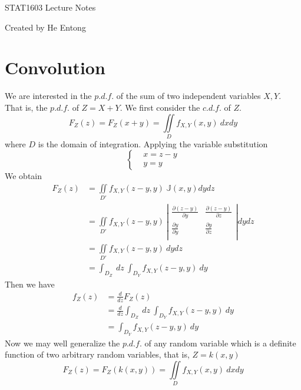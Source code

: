 \documentclass[16pt]{article}
\begin{document}
STAT1603 Lecture Notes \par
\small{Created by He Entong}
\section{Convolution}
We are interested in the $p.d.f.$ of the sum of two independent variables $X, Y$. That is, the $p.d.f.$ of $Z = X + Y$. We first consider the $c.d.f.$ of $Z$.
\begin{equation}
    F_Z(z) = F_Z(x+y) = \iint \limits_{D} f_{X,Y}(x, y) ~dxdy
\end{equation}
where $D $ is the domain of integration.
Applying the variable substitution
\begin{equation}
\left\{
\begin{aligned}
    & x = z - y\\
    & y = y
\end{aligned}
\right.
\end{equation}
We obtain
\begin{equation}
\begin{aligned}
    F_Z(z) &= \iint \limits_{D'} f_{X,Y}(z-y, y)~\mathbb{J}(x,y) dydz\\ 
    &= \iint \limits_{D'} f_{X, Y}(z-y, y)~\left| \begin{array}{cccc}
    \frac{\partial(z-y)}{\partial y} &\frac{\partial(z-y)}{\partial z} \\
    \frac{\partial y}{\partial y} &\frac{\partial y}{\partial z} \\
    \end{array} \right| dydz \\
    &= \iint \limits_{D'} f_{X,Y}(z-y, y)~dydz \\
    &= \int_{D_Z}~dz~\int_{D_Y} f_{X,Y}(z-y, y)~dy
\end{aligned}
\end{equation}
Then we have
\begin{equation}
\begin{aligned}
    f_Z(z) &= \frac{d}{dz} F_Z(z) \\
    &= \frac{d}{dz} \int_{D_Z} ~dz ~\int_{D_Y} f_{X,Y}(z-y, y)~dy \\
    &= \int_{D_Y} f_{X,Y}(z-y, y) ~dy
\end{aligned}
\end{equation}
Now we may well generalize the $p.d.f.$ of any random variable which is a definite function of two arbitrary random variables, that is, $Z = k(x, y)$
\begin{equation}
    F_Z(z) = F_Z(k(x,y)) = \iint \limits_{D} f_{X,Y}(x, y) ~dxdy
\end{equation}
\end{document}
